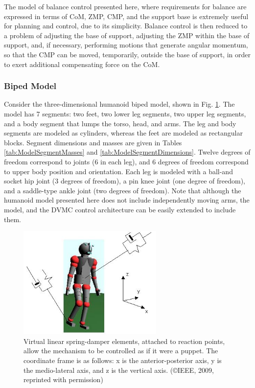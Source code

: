 \documentclass{llncs}
\begin{document}
The model of balance control presented here, where requirements for balance are expressed in terms of CoM, ZMP, CMP, and the support base 
is extremely useful for planning and control, due to its simplicity.  
Balance control is then reduced to a problem of adjusting the base of support, adjusting the ZMP within the base of support, and, if necessary, performing motions 
that generate angular momentum, so that the CMP can be moved, temporarily, outside the base of support, in order to exert additional compensating force on the CoM.


\subsubsection{Biped Model}

Consider the three-dimensional humanoid biped model, shown in Fig. \ref{fig:BipedModel}.
The model has 7 segments:  two feet, two lower leg segments, two upper leg segments, and a body segment that lumps the torso, head, and arms.  
The leg and body segments are modeled as cylinders, whereas the feet are modeled as rectangular blocks.  
Segment dimensions and masses are given in Tables \ref{tab:ModelSegmentMasses} and \ref{tab:ModelSegmentDimensions}.  
Twelve degrees of freedom correspond to joints (6 in each leg), and 6 degrees of freedom correspond to upper body position and orientation.  
Each leg is modeled with a ball-and socket hip joint (3 degrees of freedom), a pin knee joint (one degree of freedom), and a saddle-type ankle joint 
(two degrees of freedom).  
Note that although the humanoid model presented here does not include independently moving arms, the model, and the DVMC control architecture 
can be easily extended to include them.    

\begin{figure}[b]
\includegraphics[height=2.2in]{BipedModel}
\caption{Virtual linear spring-damper elements, attached to reaction points, allow the mechanism to be controlled as if it were a puppet.  
The coordinate frame is as follows: x is the anterior-posterior axis, y is the medio-lateral axis, and z is the vertical axis.
(\copyright IEEE, 2009, reprinted with permission)}
\label{fig:BipedModel}       
\end{figure}
\end{document}
